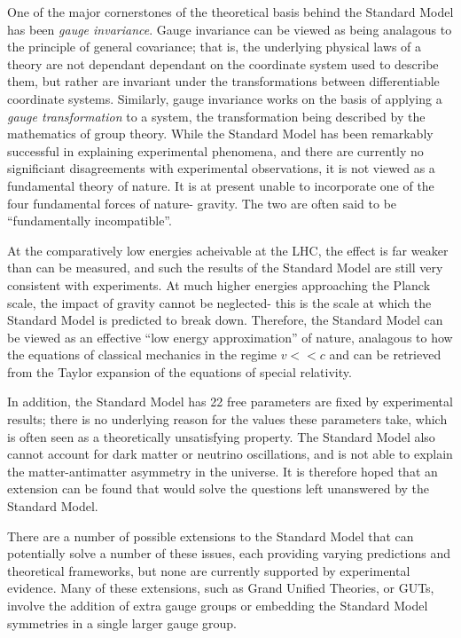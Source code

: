 \documentclass{article}
\begin{document}
One of the major cornerstones of the theoretical basis behind the Standard Model has been \textit{gauge invariance}. Gauge invariance can be viewed as being analagous to the principle of general covariance; that is, the underlying physical laws of a theory are not dependant dependant on the coordinate system used to describe them, but rather are invariant under the transformations between differentiable coordinate systems. Similarly, gauge invariance works on the basis of applying a \textit{gauge transformation} to a system, the transformation being described by the mathematics of group theory. 
While the Standard Model has been remarkably successful in explaining experimental phenomena, and there are currently no significiant disagreements with experimental observations, it is not viewed as a fundamental theory of nature. It is at present unable to incorporate one of the four fundamental forces of nature- gravity. The two are often said to be ``fundamentally incompatible''.

At the comparatively low energies acheivable at the LHC, the effect is far weaker than can be measured, and such the results of the Standard Model are still very  consistent with experiments. At much higher energies approaching the Planck scale, the impact of gravity cannot be neglected- this is the scale at which the Standard Model is predicted to break down. Therefore, the Standard Model can be viewed as an effective ``low energy approximation'' of nature, analagous to how the equations of classical mechanics in the regime $v<<c$ and can be retrieved from the Taylor expansion of the equations of special relativity.

In addition, the Standard Model has 22 free parameters are fixed by experimental results; there is no underlying reason for the values these parameters take, which is often seen as a theoretically unsatisfying property. The Standard Model also cannot account for dark matter or neutrino oscillations, and is not able to explain the matter-antimatter asymmetry in the universe. It is therefore hoped that an extension can be found that would solve the questions left unanswered by the Standard Model. 

There are a number of possible extensions to the Standard Model that can potentially solve a number of these issues, each providing varying predictions and theoretical frameworks, but none are currently supported by experimental evidence. Many of these extensions, such as Grand Unified Theories, or GUTs, involve the addition of extra gauge groups or embedding the Standard Model symmetries in a single larger gauge group.
\end{document}
